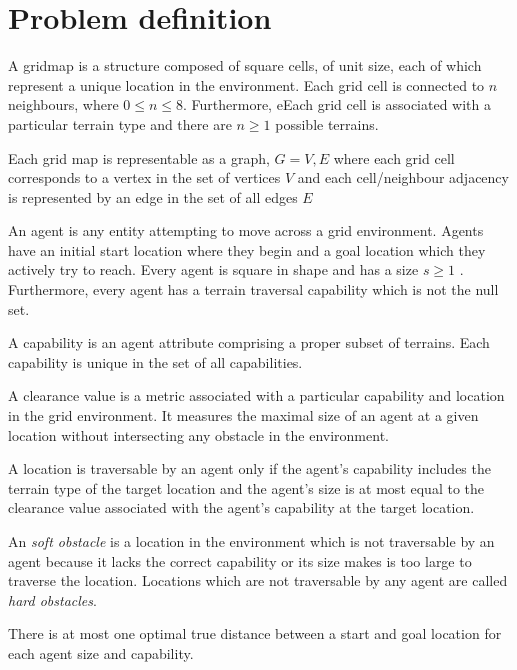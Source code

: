 \section{Problem definition}
\begin{definition}
A gridmap is a structure composed of square cells, of unit size, each of which represent a unique location in the environment. Each grid cell is connected to $n$ neighbours, where  $0 \leq n \leq 8$. Furthermore, eEach grid cell is associated with a particular terrain type and there are $n \geq 1$ possible terrains.
\end{definition}

\begin{definition}
Each grid map is representable as a graph, $G = {V, E}$ where each grid cell corresponds to a vertex in the set of vertices $V$ and each cell/neighbour adjacency is represented by an edge in the set of all edges $E$
\end{definition}

\begin{definition}
An agent is any entity attempting to move across a grid environment. Agents have an initial start location where they begin and a goal location which they actively try to reach. Every agent is square in shape and has a size $s \geq 1$ . Furthermore, every agent has a terrain traversal capability which is not the null set.
\end{definition}


\begin{definition}
A capability is an agent attribute comprising a proper subset of terrains. Each capability is unique in the set of all capabilities. 
\end{definition}

\begin{definition}A clearance value is a metric associated with a particular capability and location in the grid environment. It measures the maximal size of an agent at a given location without intersecting any obstacle in the environment. 
\end{definition}

\begin{definition}
A location is traversable by an agent only if the agent's capability includes the terrain type of the target location and the agent's size is at most equal to the  clearance value associated with the agent's capability at the target location. 
\end{definition}

\begin{definition}
An \emph{soft obstacle} is a location in the environment which is not traversable by an agent because it lacks the correct capability or its size makes is too large to traverse the location.  Locations which are not traversable by any agent are called \emph{hard obstacles}.
\end{definition}

\begin{definition}
There is at most one optimal true distance between a start and goal location for each agent size and capability.
\end{definition}

